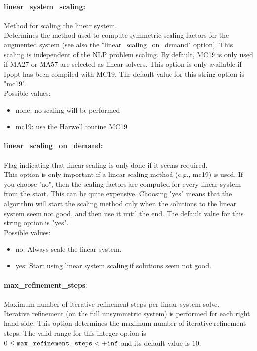 \paragraph{linear\_system\_scaling:}\label{sec:linear_system_scaling} Method for scaling the linear system. $\;$ \\
 Determines the method used to compute symmetric
scaling factors for the augmented system (see
also the "linear\_scaling\_on\_demand" option). 
This scaling is independent of the NLP problem
scaling.  By default, MC19 is only used if MA27
or MA57 are selected as linear solvers. This
option is only available if Ipopt has been
compiled with MC19.
The default value for this string option is "mc19".
\\ 
Possible values:
\begin{itemize}
   \item none: no scaling will be performed
   \item mc19: use the Harwell routine MC19
\end{itemize}

\paragraph{linear\_scaling\_on\_demand:}\label{sec:linear_scaling_on_demand} Flag indicating that linear scaling is only done if it seems required. $\;$ \\
 This option is only important if a linear scaling
method (e.g., mc19) is used.  If you choose "no",
then the scaling factors are computed for every
linear system from the start.  This can be quite
expensive. Choosing "yes" means that the
algorithm will start the scaling method only when
the solutions to the linear system seem not good,
and then use it until the end.
The default value for this string option is "yes".
\\ 
Possible values:
\begin{itemize}
   \item no: Always scale the linear system.
   \item yes: Start using linear system scaling if solutions
seem not good.
\end{itemize}

\paragraph{max\_refinement\_steps:}\label{sec:max_refinement_steps} Maximum number of iterative refinement steps per linear system solve. $\;$ \\
 Iterative refinement (on the full unsymmetric
system) is performed for each right hand side. 
This option determines the maximum number of
iterative refinement steps. The valid range for this integer option is
$0 \le {\tt max\_refinement\_steps } <  {\tt +inf}$
and its default value is $10$.


